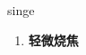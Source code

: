 
\begin{frame}
{\huge singe}
\begin{center}
\begin{enumerate}\Large
  \item \textbf{轻微烧焦}
\end{enumerate}
\end{center}
\end{frame}
